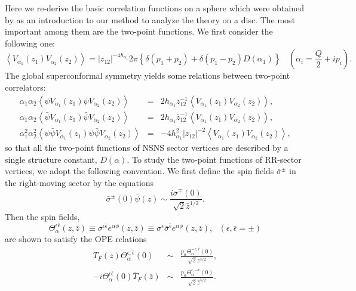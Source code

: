 \documentclass[a4paper,12pt]{article}
\newcommand{\vev}[1]{\left<{#1}\right>}
\newcommand{\tfrac}[2]{{\textstyle\frac{#1}{#2}}}
\newcommand{\mfrac}[2]{{\displaystyle\frac{#1}{#2}}}
\newcommand{\ep}{{\epsilon}}
\newcommand{\bep}{{\bar{\epsilon}}}
\begin{document}
   Here we re-derive the basic correlation functions on a sphere
 which were obtained by \cite{Poghosian,RS} as an introduction
 to our method to analyze the theory on a disc.
 The most important among them are the two-point functions.
 We first consider the following one:
\begin{equation}
  \vev{V_{\alpha_1}(z_1)V_{\alpha_2}(z_2)}
 = |z_{12}|^{-4h_{\alpha_1}}2\pi
   \left\{\delta(p_1+p_2) +\delta(p_1-p_2)D(\alpha_1)   \right\}
  ~~~~(\alpha_i=\tfrac{Q}{2}+ip_i).
\end{equation}
 The global superconformal symmetry yields some
 relations between two-point correlators:
\begin{eqnarray}
  \alpha_1\alpha_2\vev{\psi V_{\alpha_1}(z_1)\psi V_{\alpha_2}(z_2)}
 &=& 2h_{\alpha_1}z_{12}^{-1}
    \vev{V_{\alpha_1}(z_1)V_{\alpha_2}(z_2)}, \nonumber \\
  \alpha_1\alpha_2\vev{\bar{\psi}V_{\alpha_1}(z_1)\bar{\psi}V_{\alpha_2}(z_2)}
 &=& 2h_{\alpha_1}\bar{z}_{12}^{-1}
    \vev{V_{\alpha_1}(z_1)V_{\alpha_2}(z_2)}, \\
  \alpha_1^2\alpha_2^2
  \vev{\psi\bar{\psi}V_{\alpha_1}(z_1)\psi\bar{\psi}V_{\alpha_2}(z_2)}
 &=& -4h_{\alpha_1}^2|z_{12}|^{-2}
    \vev{V_{\alpha_1}(z_1)V_{\alpha_2}(z_2)}, \nonumber
\end{eqnarray}
 so that all the two-point functions of NSNS sector vertices
 are described by a single structure constant, $D(\alpha)$.
 To study the two-point functions of RR-sector vertices, we adopt
 the following convention.
 We first define the spin fields $\bar{\sigma}^\pm$ in the
 right-moving sector by the equations
\begin{equation}
  \bar{\sigma}^\pm(0)\bar{\psi}(z)\sim
  \frac{i\bar{\sigma}^\mp(0)}{\sqrt{2}\bar{z}^{1/2}}.
\label{sxpb}
\end{equation}
 Then the spin fields,
\begin{equation}
  \Theta_\alpha^{\ep\bep}(z,\bar{z})\equiv
  \sigma^{\ep\bep}e^{\alpha\phi}(z,\bar{z})\equiv
  \sigma^\ep\bar{\sigma}^{\bep}e^{\alpha\phi}(z,\bar{z}),~~~
  (\ep,\bep=\pm)
\end{equation}
 are shown to satisfy the OPE relations
\begin{equation}
\begin{array}{rcl}
  T_F(z)\Theta_\alpha^{\ep,\bep}(0)
 &\sim& \mfrac{p_\alpha\Theta_\alpha^{-\ep,\bep}(0)}{\sqrt{2}z^{3/2}},\\
  -i\Theta_\alpha^{\ep\bep}(0)\bar{T}_F(\bar{z})
 &\sim& \mfrac{p_\alpha\Theta_\alpha^{\ep,-\bep}(0)}{\sqrt{2}\bar{z}^{3/2}}.
\end{array}
\end{equation}
\end{document}
